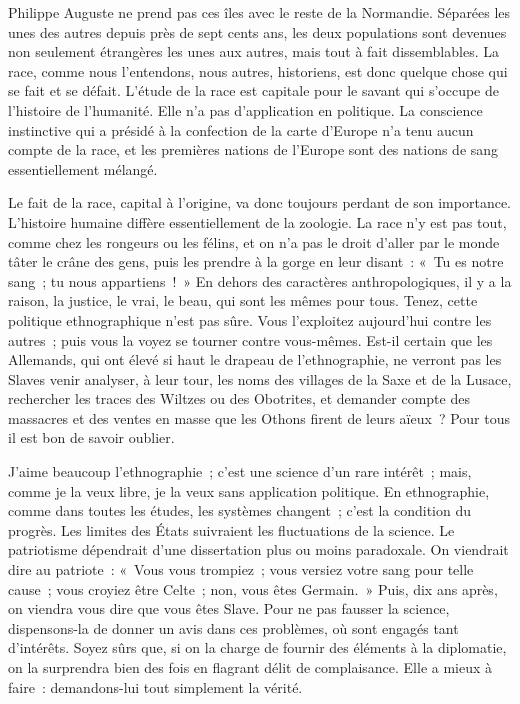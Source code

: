 \documentclass[twoside]{book} %
\newcommand\orgName[1]{#1}
\newcommand\persName[1]{#1}
\newcommand\placeName[1]{#1}
\begin{document}
{\persName Philippe Auguste} ne prend pas ces îles avec le reste de la {\placeName Normandie}. Séparées les unes des autres depuis près de sept cents ans, les deux populations sont devenues non seulement étrangères les unes aux autres, mais tout à fait dissemblables. La race, comme nous l’entendons, nous autres, historiens, est donc quelque chose qui se fait et se défait. L’étude de la race est capitale pour le savant qui s’occupe de l’histoire de l’humanité. Elle n’a pas d’application en politique. La conscience instinctive qui a présidé à la confection de la carte d’{\placeName Europe} n’a tenu aucun compte de la race, et les premières nations de l’{\placeName Europe} sont des nations de sang essentiellement mélangé.\par
Le fait de la race, capital à l’origine, va donc toujours perdant de son importance. L’histoire humaine diffère essentiellement de la zoologie. La race n’y est pas tout, comme chez les rongeurs ou les félins, et on n’a pas le droit d’aller par le monde tâter le crâne des gens, puis les prendre à la gorge en leur disant : « Tu es notre sang ; tu nous appartiens ! » En dehors des caractères anthropologiques, il y a la raison, la justice, le vrai, le beau, qui sont les mêmes pour tous. Tenez, cette politique ethnographique n’est pas sûre. Vous l’exploitez aujourd’hui contre les autres ; puis vous la voyez se tourner contre vous-mêmes. Est-il certain que les {\orgName Allemands}, qui ont élevé si haut le drapeau de l’ethnographie, ne verront pas les {\orgName Slaves} venir analyser, à leur tour, les noms des villages de la {\placeName Saxe} et de la {\placeName Lusace}, rechercher les traces des {\orgName Wiltzes} ou des {\orgName Obotrites}, et demander compte des massacres et des ventes en masse que les {\orgName Othons} firent de leurs aïeux ? Pour tous il est bon de savoir oublier.\par
J’aime beaucoup l’ethnographie ; c’est une science d’un rare intérêt ; mais, comme je la veux libre, je la veux sans application politique. En ethnographie, comme dans toutes les études, les systèmes changent ; c’est la condition du progrès. Les limites des États suivraient les fluctuations de la science. Le patriotisme dépendrait d’une dissertation plus ou moins paradoxale. On viendrait dire au patriote : « Vous vous trompiez ; vous versiez votre sang pour telle cause ; vous croyiez être Celte ; non, vous êtes Germain. » Puis, dix ans après, on viendra vous dire que vous êtes Slave. Pour ne pas fausser la science, dispensons-la de donner un avis dans ces problèmes, où sont engagés tant d’intérêts. Soyez sûrs que, si on la charge de fournir des éléments à la diplomatie, on la surprendra bien des fois en flagrant délit de complaisance. Elle a mieux à faire : demandons-lui tout simplement la vérité.
\end{document}
